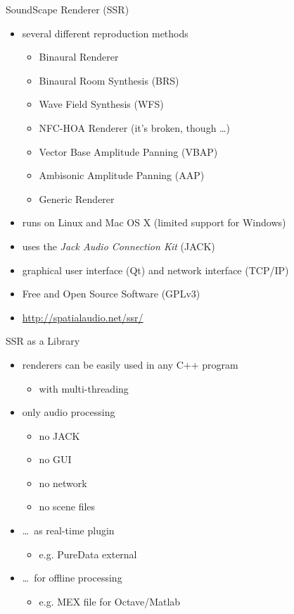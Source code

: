 \documentclass{beamer}
\begin{document}
\begin{frame}{SoundScape Renderer (SSR)}
\begin{itemize}
\item several different reproduction methods
\begin{itemize}
\item Binaural Renderer
\item Binaural Room Synthesis (BRS)
\item Wave Field Synthesis (WFS)
\item NFC-HOA Renderer (it's broken, though \dots)
\item Vector Base Amplitude Panning (VBAP)
\item Ambisonic Amplitude Panning (AAP)
\item Generic Renderer
\end{itemize}
\end{itemize}

\pause

\begin{itemize}
\item runs on Linux and Mac OS X (limited support for Windows)
\item uses the \emph{Jack Audio Connection Kit} (JACK)
\item graphical user interface (Qt) and network interface (TCP/IP)
\item Free and Open Source Software (GPLv3)
\item \url{http://spatialaudio.net/ssr/}
\end{itemize}
\end{frame}

\begin{frame}{SSR as a Library}
\begin{itemize}
\item renderers can be easily used in any C++ program
\begin{itemize}
\item with multi-threading
\end{itemize}
\item only audio processing
\begin{itemize}
\item no JACK
\item no GUI
\item no network
\item no scene files
\end{itemize}
\item \dots\ as real-time plugin
\begin{itemize}
\item e.g. PureData external
\end{itemize}
\item \dots\ for offline processing
\begin{itemize}
\item e.g. MEX file for Octave/Matlab
\end{itemize}
\end{itemize}
\end{frame}
\end{document}
